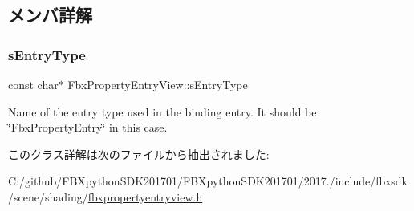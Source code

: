 \subsection{メンバ詳解}
\mbox{\label{class_fbx_property_entry_view_a862b7d0e633c2cb246b5b63a48ffd706}} 
\subsubsection{\texorpdfstring{s\+Entry\+Type}{sEntryType}}
{\footnotesize\ttfamily const char$\ast$ Fbx\+Property\+Entry\+View\+::s\+Entry\+Type\hspace{0.3cm}{\ttfamily [static]}}

Name of the entry type used in the binding entry. It should be \char`\"{}\+Fbx\+Property\+Entry\char`\"{} in this case. 

このクラス詳解は次のファイルから抽出されました\+:\begin{DoxyCompactItemize}
\item 
C\+:/github/\+F\+B\+Xpython\+S\+D\+K201701/\+F\+B\+Xpython\+S\+D\+K201701/2017./include/fbxsdk/scene/shading/\hyperlink{fbxpropertyentryview_8h}{fbxpropertyentryview.\+h}\end{DoxyCompactItemize}
